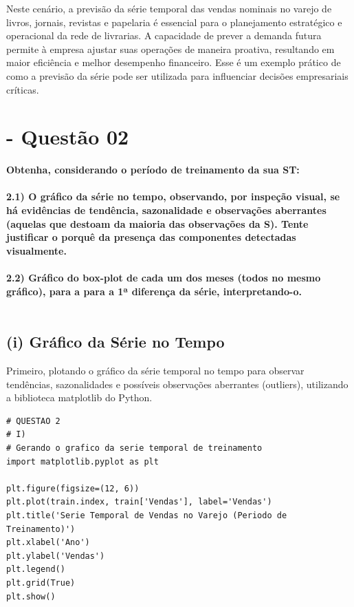 \documentclass[a4paper, 12pt]{article}
\begin{document}
Neste cenário, a previsão da série temporal das vendas nominais no varejo de livros, jornais, revistas e papelaria é essencial para o planejamento estratégico e operacional da rede de livrarias. A capacidade de prever a demanda futura permite à empresa ajustar suas operações de maneira proativa, resultando em maior eficiência e melhor desempenho financeiro. Esse é um exemplo prático de como a previsão da série pode ser utilizada para influenciar decisões empresariais críticas. 


\newpage
\section{- Questão 02}

\textbf{
Obtenha, considerando o período de treinamento da sua ST: \\\\
2.1) O gráfico da série no tempo, observando, por inspeção visual, se há evidências
de tendência, sazonalidade e observações aberrantes (aquelas que destoam
da maioria das observações da S). Tente justificar o porquê da presença das
componentes detectadas visualmente. \\\\
2.2) Gráfico do box-plot de cada um dos meses (todos no mesmo gráfico), para a
para a 1ª diferença da série, interpretando-o.
} \\\\


\subsection{ (i) Gráfico da Série no Tempo}
Primeiro, plotando o gráfico da série temporal no tempo para observar tendências, sazonalidades e possíveis observações aberrantes (outliers), utilizando a biblioteca matplotlib do Python.\\

\begin{lstlisting}[style=python]
# QUESTAO 2
# I)
# Gerando o grafico da serie temporal de treinamento
import matplotlib.pyplot as plt

plt.figure(figsize=(12, 6))
plt.plot(train.index, train['Vendas'], label='Vendas')
plt.title('Serie Temporal de Vendas no Varejo (Periodo de Treinamento)')
plt.xlabel('Ano')
plt.ylabel('Vendas')
plt.legend()
plt.grid(True)
plt.show()
    \end{lstlisting} \\
\end{document}
